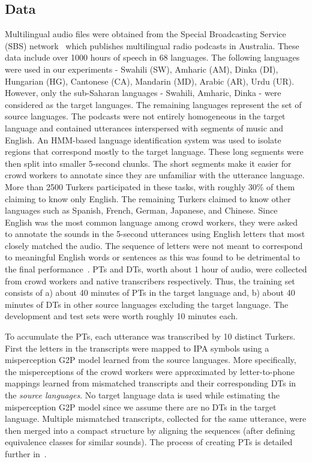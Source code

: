 \documentclass[a4paper]{article}
\begin{document}
\subsection{Data} \vspace{-1mm}
Multilingual audio files were obtained from the Special Broadcasting Service (SBS) network~\cite{SBS} which publishes multilingual radio podcasts in Australia. These data include over 1000 hours of speech in 68 languages.
The following languages were used in our experiments - Swahili (SW), Amharic (AM), Dinka (DI), Hungarian (HG), Cantonese (CA), Mandarin (MD), Arabic (AR), Urdu (UR). However, only the sub-Saharan languages - Swahili, Amharic, Dinka - were considered as the target languages. The remaining languages represent the set of source languages. The podcasts were not entirely homogeneous in the target language and contained utterances interspersed with segments of music and English. An HMM-based language identification system was used to isolate regions that correspond mostly to the target language. These long segments were then split into smaller 5-second chunks. The short segments make it easier for crowd workers to annotate since they are unfamiliar with the utterance language. More than 2500 Turkers participated in these tasks, with roughly 30\% of them claiming to know only English. The remaining Turkers claimed to know other languages such as Spanish, French, German, Japanese, and Chinese. Since English was the most common language among crowd workers, they were asked to annotate the sounds in the 5-second utterances using English letters that most closely matched the audio. The sequence of letters were not meant to correspond to meaningful English words or sentences as this was found to be detrimental to the final performance~\cite{Jyothi2015}. PTs and DTs, worth about 1 hour of audio, were collected from crowd workers and native transcribers respectively. Thus, the training set consists of a) about 40 minutes of PTs in the target language and, b) about 40 minutes of DTs in other source languages  excluding the target language. The development and test sets were worth roughly 10 minutes each. 

To accumulate the PTs, each utterance was transcribed by 10 distinct Turkers. First the letters in the transcripts were mapped to IPA symbols using a misperception G2P model learned from the source languages. More specifically, the misperceptions of the crowd workers were approximated by letter-to-phone mappings learned from mismatched transcripts and their corresponding DTs in the \emph{source languages}. No target language data is used while estimating the misperception G2P model since we assume there are no DTs in the target language. Multiple mismatched transcripts, collected for the same utterance, were then merged into a compact structure by aligning the sequences (after defining equivalence classes for similar sounds). The process of creating PTs is detailed further in~\cite{Jyothi-MismatchedCrowdsourcingTrans}.
\end{document}
